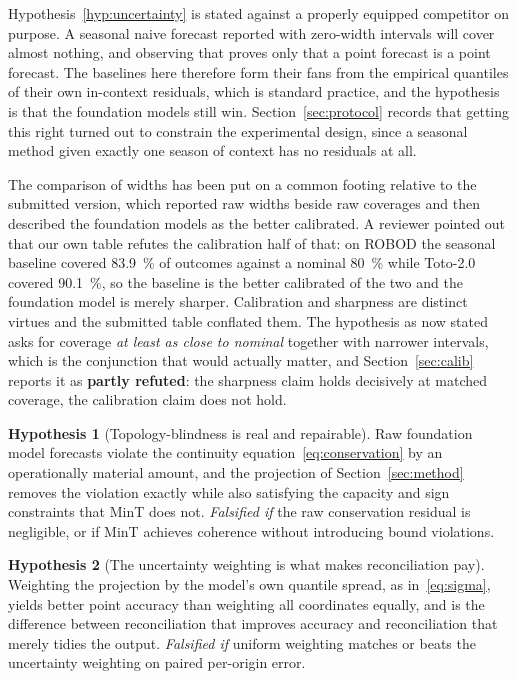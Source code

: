 \documentclass[11pt]{article}
\theoremstyle{plain}
\theoremstyle{definition}
\newtheorem{hypothesis}{Hypothesis}
\theoremstyle{remark}
\newif\ifrevisionmarkup
\newcommand{\new}[1]{\ifrevisionmarkup\textcolor{revision}{#1}\else#1\fi}
\begin{document}
Hypothesis~\ref{hyp:uncertainty} is stated against a properly equipped competitor on purpose. A seasonal naive forecast reported with zero-width intervals will cover almost nothing, and observing that proves only that a point forecast is a point forecast. The baselines here therefore form their fans from the empirical quantiles of their own in-context residuals, which is standard practice, and the hypothesis is that the foundation models still win. Section~\ref{sec:protocol} records that getting this right turned out to constrain the experimental design, since a seasonal method given exactly one season of context has no residuals at all.

\new{The comparison of widths has been put on a common footing relative to the submitted version, which reported raw widths beside raw coverages and then described the foundation models as the better calibrated. A reviewer pointed out that our own table refutes the calibration half of that: on ROBOD the seasonal baseline covered \SI{83.9}{\percent} of outcomes against a nominal \SI{80}{\percent} while Toto-2.0 covered \SI{90.1}{\percent}, so the baseline is the better calibrated of the two and the foundation model is merely sharper. Calibration and sharpness are distinct virtues and the submitted table conflated them. The hypothesis as now stated asks for coverage \emph{at least as close to nominal} together with narrower intervals, which is the conjunction that would actually matter, and Section~\ref{sec:calib} reports it as \textbf{partly refuted}: the sharpness claim holds decisively at matched coverage, the calibration claim does not hold.}

\begin{hypothesis}[Topology-blindness is real and repairable]
\label{hyp:coherence}
Raw foundation model forecasts violate the continuity equation~\eqref{eq:conservation} by an operationally material amount, and the projection of Section~\ref{sec:method} removes the violation exactly while also satisfying the capacity and sign constraints that MinT does not.
\emph{Falsified if} the raw conservation residual is negligible, or if MinT achieves coherence without introducing bound violations.
\end{hypothesis}

\begin{hypothesis}[The uncertainty weighting is what makes reconciliation pay]
\label{hyp:weights}
Weighting the projection by the model's own quantile spread, as in~\eqref{eq:sigma}, yields better point accuracy than weighting all coordinates equally, and is the difference between reconciliation that improves accuracy and reconciliation that merely tidies the output.
\emph{Falsified if} uniform weighting matches or beats the uncertainty weighting on paired per-origin error.
\end{hypothesis}
\end{document}
